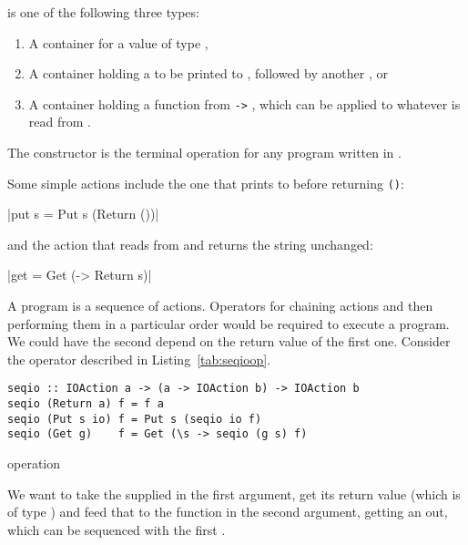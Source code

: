 \documentclass[thesis-solanki.tex]{subfiles}
\begin{document}
 is one of the following three types:
\begin{enumerate}
\item A container for a value of type ,

\item A container holding a  to be printed to ,
  followed by another , or

\item A container holding a function from  \Verb!->! , which can be applied
  to whatever  is read from . 
\end{enumerate}

The  constructor is the terminal operation for any program written in . 

Some simple actions include the one that prints to  before returning \Verb!()!:

|put s = Put s (Return ())|

and the action that reads from  and returns the string unchanged:

|get = Get (\s -> Return s)|

A program is a sequence of actions. Operators for chaining actions and then performing them in a particular order would be required to execute
a program. We could have the second  depend on the return value of the first one. Consider the 
operator described in Listing~\ref{tab:seqioop}.

\begin{code-list}[H]
\begin{singlespace}
\begin{verbatim}
seqio :: IOAction a -> (a -> IOAction b) -> IOAction b
seqio (Return a) f = f a
seqio (Put s io) f = Put s (seqio io f)
seqio (Get g)    f = Get (\s -> seqio (g s) f)
\end{verbatim}
\end{singlespace}
\caption{ operation}
\label{tab:seqioop}
\end{code-list}


We want to take the   supplied in the first argument, get its return value (which is of type ) and feed that to the function in 
the second argument, getting an   out, which can be sequenced with the first  .
\end{document}
